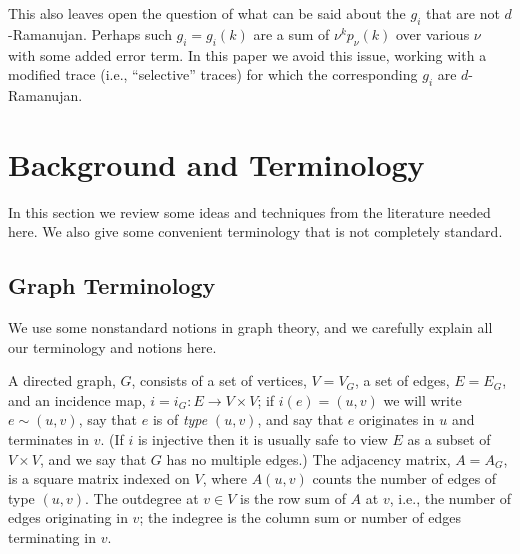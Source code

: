 \documentclass[12pt]{article}
\newcommand{\dtreelike}{{$d$-Ramanujan}}
\newcommand{\from}{\colon}
\begin{document}
This also leaves open the question of what can be said about the $g_i$
that are not {\dtreelike}.
Perhaps such $g_i=g_i(k)$ are a sum of $\nu^k p_\nu(k)$ over various $\nu$
with some added error term.  In this paper we avoid this issue,
working with a modified trace (i.e., ``selective'' traces)
for which the corresponding $g_i$ are {\dtreelike}.

\section{Background and Terminology}

In this section we review some ideas and techniques from the literature
needed here.  We also give some convenient terminology that is not
completely standard.


\subsection{Graph Terminology}

We use some nonstandard notions in graph theory, and we carefully
explain all our
terminology and notions here.

A directed graph, $G$, consists of a set of vertices, $V=V_G$, a set of
edges, $E=E_G$, and an incidence map, $i=i_G\from E\to V\times V$; if
$i(e)=(u,v)$ we will write $e\sim(u,v)$, say that $e$ is of {\em type}
$(u,v)$, and say that $e$ originates in $u$ and terminates in $v$.
(If $i$ is injective then it is usually safe to view $E$ as a subset of
$V\times V$, and we say that $G$ has no multiple edges.)  The adjacency
matrix, $A=A_G$, is a square matrix indexed on $V$, where $A(u,v)$ counts
the number of edges of type $(u,v)$.  The outdegree at $v\in V$ is the
row sum of $A$ at $v$, i.e., the number of edges originating in $v$; the
indegree is the column sum or number of edges terminating in $v$.
\end{document}

